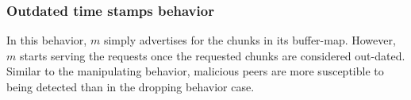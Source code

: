 \subsubsection*{Outdated time stamps behavior}
In this behavior, $m$ simply advertises for the chunks in its buffer-map. 
However, $m$ starts serving the requests once the requested chunks are considered out-dated.
Similar to the manipulating behavior, malicious peers are more susceptible to being detected than in the dropping behavior case.




